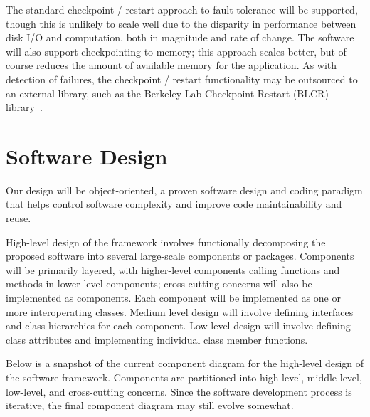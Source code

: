 \documentclass[10pt]{article}
\begin{document}
The standard checkpoint / restart approach to fault tolerance will be
supported, though this is unlikely to scale well due to the disparity
in performance between disk I/O and computation, both in magnitude and
rate of change.  The software will also support checkpointing to
memory; this approach scales better, but of course reduces the amount
of available memory for the application.  As with detection of
failures, the checkpoint / restart functionality may be outsourced to
an external library, such as the Berkeley Lab Checkpoint Restart
(BLCR) library~\cite{wwwblcr}.


\section{Software Design} \label{s:design}


Our design will be object-oriented, a proven software design and
coding paradigm that helps control software complexity and improve
code maintainability and reuse.

High-level design of the framework involves functionally decomposing
the proposed software into several large-scale components or packages.
Components will be primarily layered, with higher-level components
calling functions and methods in lower-level components; cross-cutting
concerns will also be implemented as components.  Each component will
be implemented as one or more interoperating classes.  Medium level
design will involve defining interfaces and class hierarchies for each
component.  Low-level design will involve defining class attributes
and implementing individual class member functions.

Below is a snapshot of the current component diagram for the
high-level design of the software framework.  Components are
partitioned into high-level, middle-level, low-level, and
cross-cutting concerns.  Since the software development process is
iterative, the final component diagram may still evolve somewhat.
\end{document}
